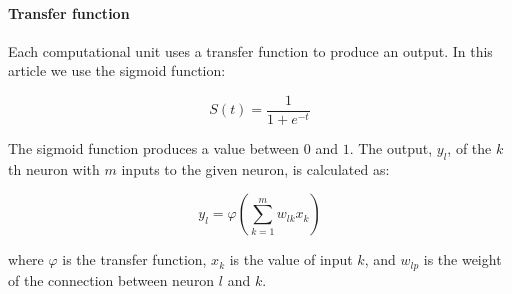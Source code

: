 \paragraph{Transfer function}

Each computational unit uses a transfer function to produce an output. In this article we use the sigmoid function:

\[
    S(t) = \frac{1}{1+e^{-t}}
\]

The sigmoid function produces a value between $0$ and $1$. The output, $y_l$, of the $k$th neuron with $m$ inputs to the given neuron, is calculated as:

\[
    y_l = \varphi\left( \sum_{k=1}^m w_{lk} x_k \right)
\]

where $\varphi$ is the transfer function, $x_k$ is the value of input $k$, and $w_{l p}$ is the weight of the connection between neuron $l$ and $k$.
